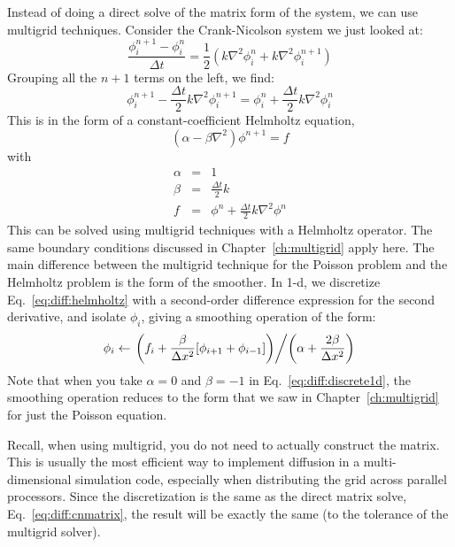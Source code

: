Instead of doing a direct solve of the matrix form of the system, we 
can use multigrid techniques.  Consider the Crank-Nicolson system we just 
looked at:
\begin{equation}
\frac{\phi^{n+1}_i - \phi^n_i}{\Delta t} = 
   \frac{1}{2} \left ( k \nabla^2 \phi^n_i + k \nabla^2 \phi^{n+1}_i \right )
\end{equation}
Grouping all the 
$n+1$ terms on the left, we find:
\begin{equation}
\phi^{n+1}_i - \frac{\Delta t}{2} k \nabla^2 \phi^{n+1}_i = 
    \phi^n_i + \frac{\Delta t}{2} k \nabla^2 \phi^n_i
\end{equation}
This is in the form of a constant-coefficient Helmholtz equation,
\begin{equation}
\label{eq:diff:helmholtz}
(\alpha - \beta \nabla^2) \phi^{n+1} = f
\end{equation}
with
\begin{eqnarray}
\alpha &=& 1 \\
\beta &=& \frac{\Delta t}{2} k \\
f &=& \phi^n + \frac{\Delta t}{2} k \nabla^2 \phi^n
\end{eqnarray}
This can be solved using multigrid techniques with a Helmholtz
operator.  The same boundary conditions discussed in
Chapter~\ref{ch:multigrid} apply here.  The main difference between
the multigrid technique for the Poisson problem and the Helmholtz
problem is the form of the smoother.  In 1-d, we discretize
Eq.~\ref{eq:diff:helmholtz} with a second-order difference expression
for the second derivative, and isolate $\phi_i$, giving a smoothing
operation of the form:
\begin{equation}
\label{eq:diff:discrete1d}
\phi_{i} \leftarrow
 \left .    \left ( f_{i} + \frac{\beta}{\Delta x^2} [\phi_{i+1}
                             + \phi_{i-1}] \right ) \middle / 
\left ( \alpha + \frac{2 \beta}{\Delta x^2}  \right )  \right .
\end{equation}
Note that when you take $\alpha = 0$ and $\beta = -1$ in
Eq.~\ref{eq:diff:discrete1d}, the smoothing operation reduces to the
form that we saw in Chapter~\ref{ch:multigrid} for just the Poisson
equation.

Recall, when using multigrid, you do not need to actually construct the
matrix.  This is usually the most efficient way to implement diffusion
in a multi-dimensional simulation code, especially when distributing
the grid across parallel processors.  Since the discretization is the
same as the direct matrix solve, Eq.~\ref{eq:diff:cnmatrix}, the
result will be exactly the same (to the tolerance of the multigrid
solver).

